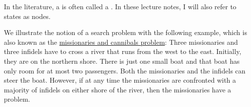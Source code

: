 \remark
In the literature, a  is often called a .  In these lecture
notes, I will also refer to states as nodes.  \eoxs

\example
We illustrate the notion of a search problem with the following example, which is also known as the
\href{https://en.wikipedia.org/wiki/Missionaries_and_cannibals_problem}{missionaries and cannibals problem}:
Three missionaries and three infidels have to cross a river that runs from the west to the east.
Initially, they are on the northern shore.  There is just one small boat and that boat has only room
for at most two passengers.  Both the missionaries and the infidels can steer the boat.  However, if
at any time the missionaries are confronted with a majority of infidels on either shore of the
river, then the missionaries have a problem.

